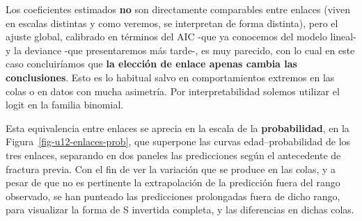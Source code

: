 \documentclass[
  letterpaper,
  DIV=11,
  numbers=noendperiod]{scrartcl}
\begin{document}
Los coeficientes estimados \textbf{no} son directamente comparables
entre enlaces (viven en escalas distintas y como veremos, se interpretan
de forma distinta), pero el ajuste global, calibrado en términos del AIC
-que ya conocemos del modelo lineal- y la deviance -que presentaremos
más tarde-, es muy parecido, con lo cual en este caso concluiríamos que
\textbf{la elección de enlace apenas cambia las conclusiones}. Esto es
lo habitual salvo en comportamientos extremos en las colas o en datos
con mucha asimetría. Por interpretabilidad solemos utilizar el logit en
la familia binomial.

Esta equivalencia entre enlaces se aprecia en la escala de la
\textbf{probabilidad}, en la Figura~\ref{fig-u12-enlaces-prob}, que
superpone las curvas edad--probabilidad de los tres enlaces, separando
en dos paneles las predicciones según el antecedente de fractura previa.
Con el fin de ver la variación que se produce en las colas, y a pesar de
que no es pertinente la extrapolación de la predicción fuera del rango
observado, se han punteado las predicciones prolongadas fuera de dicho
rango, para visualizar la forma de S invertida completa, y las
diferencias en dichas colas.
\end{document}
